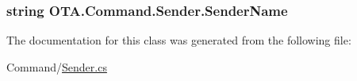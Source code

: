 \subsubsection[{Sender\+Name}]{\setlength{\rightskip}{0pt plus 5cm}string O\+T\+A.\+Command.\+Sender.\+Sender\+Name\hspace{0.3cm}{\ttfamily [get]}}\label{class_o_t_a_1_1_command_1_1_sender_a37505848a1ead3678bd828309ae91a75}


The documentation for this class was generated from the following file\+:\begin{DoxyCompactItemize}
\item 
Command/\hyperlink{_sender_8cs}{Sender.\+cs}\end{DoxyCompactItemize}
